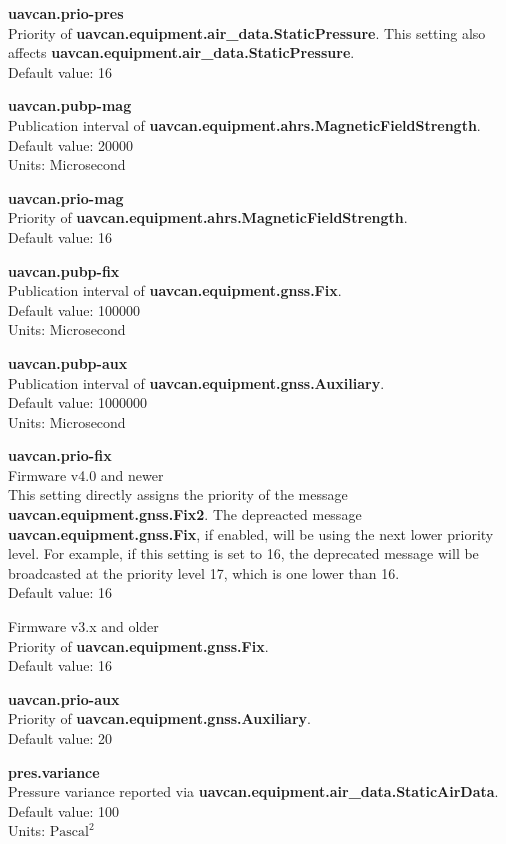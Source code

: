 \documentclass{zubaxdoc}
\begin{document}
\textbf{uavcan.prio-pres}\\
Priority of \textbf{uavcan.equipment.air{\_}data.StaticPressure}. This setting also affects \textbf{uavcan.equipment.air{\_}data.StaticPressure}.\\
Default value: 16
 
\textbf{uavcan.pubp-mag}\\
Publication interval of \textbf{uavcan.equipment.ahrs.MagneticFieldStrength}.\\
Default value: 20000\\
Units: Microsecond

\textbf{uavcan.prio-mag}\\
Priority of \textbf{uavcan.equipment.ahrs.MagneticFieldStrength}.\\
Default value: 16

\textbf{uavcan.pubp-fix}\\
Publication interval of \textbf{uavcan.equipment.gnss.Fix}.\\
Default value: 100000\\
Units: Microsecond

\textbf{uavcan.pubp-aux}\\
Publication interval of \textbf{uavcan.equipment.gnss.Auxiliary}.\\
Default value: 1000000\\
Units: Microsecond

\textbf{uavcan.prio-fix}\\
Firmware v4.0 and newer\\
This setting directly assigns the priority of the message \textbf{uavcan.equipment.gnss.Fix2}. The depreacted message  \textbf{uavcan.equipment.gnss.Fix}, if enabled, will be using the next lower priority level. For example, if this setting is set to 16, the deprecated message will be broadcasted at the priority level 17, which is one lower than 16.\\
Default value: 16

Firmware v3.x and older\\
Priority of \textbf{uavcan.equipment.gnss.Fix}.\\
Default value: 16

\textbf{uavcan.prio-aux}\\
Priority of \textbf{uavcan.equipment.gnss.Auxiliary}.\\
Default value: 20

\textbf{pres.variance}\\
Pressure variance reported via \textbf{uavcan.equipment.air{\_}data.StaticAirData}.\\
Default value: 100\\
Units: $\text{Pascal}^2$
\end{document}
